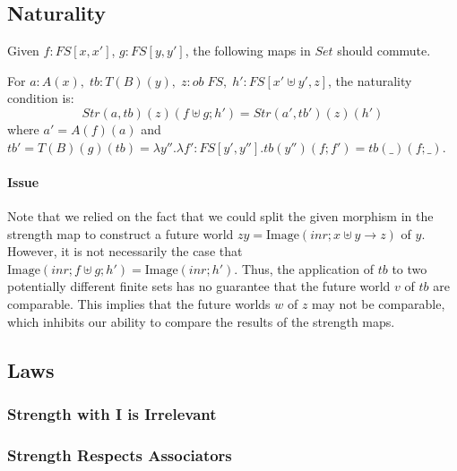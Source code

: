 \documentclass{article}
\begin{document}
\subsection{Naturality}
Given $f : FS[x , x']$, $g: FS[y , y']$, the following maps in $Set$ should commute.
\begin{figure}[!ht]
    \centering
{}
\end{figure}

For $a : A(x),\; tb : T(B)(y),\; z : ob\;FS ,\; h' : FS [ x' \uplus y' , z]$, the naturality condition is:
\[
 Str(a,tb)(z)(f \uplus g ; h') = Str(a',tb')(z)(h')   
\]
where $a' = A(f)(a)$ and $tb' = T(B)(g)(tb) = \lambda y''. \lambda f' : FS [ y' , y'']. tb(y'')(f ; f') = tb(\_)(f ; \_)$.
\paragraph*{Issue}
Note that we relied on the fact that we could split the given morphism in the strength map to construct a future world 
$zy = \textrm{Image}(inr ; x \uplus y \rightarrow z)$ of $y$.
However, it is not necessarily the case that $\textrm{Image}(inr ; f \uplus g ; h') = \textrm{Image}(inr ; h')$.
Thus, the application of $tb$ to two potentially different finite sets has no guarantee that the future world $v$ of $tb$ are comparable.
This implies that the future worlds $w$ of $z$ may not be comparable, which inhibits our ability to compare the results of the strength maps.  

\subsection{Laws}
\subsubsection{Strength with I is Irrelevant}
\subsubsection{Strength Respects Associators}
\end{document}
